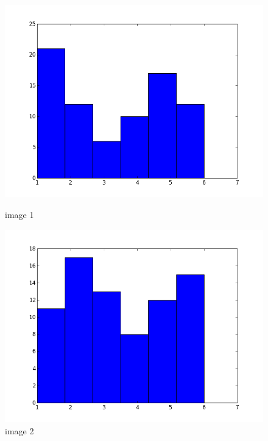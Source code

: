 \documentclass[xcolor=table]{beamer}
\begin{document}
\begin{frame}
\begin{figure}[htbp]
\begin{minipage}[c]{.45\linewidth}
\begin{center}
\includegraphics[scale=0.20]{hist_img_1.png}
\caption{image 1}
\label{fig:image4}
\end{center}
\end{minipage}
\hfill
\begin{minipage}[c]{.45\linewidth}
\begin{center}
\includegraphics[scale=0.20]{hist_img_2.png}
\caption{image 2}
\label{fig:image5}
\end{center}
\end{minipage}
\end{figure}


\end{frame}
\end{document}
